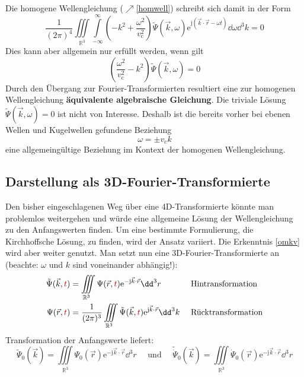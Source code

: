 		 Die homogene Wellengleichung ($\nearrow$\ref{homwell}) schreibt sich damit in der Form
		        \begin{equation}
			        \frac{1}{(2\pi)^4} \iiint\limits_{\mathbb{R}^3} \int\limits_{-\infty}^\infty \left(-k^2+\frac{\omega^2}{ v_\mathrm{c}^2} \right)\tilde{\Psi}(\vec{k}, \omega)  \mathrm{e}^{\mathrm{j}(\vec{k}\cdot\vec{r} -\omega t)} \dd \omega \dd^3k  = 0
		        \end{equation}
		  Dies kann aber allgemein nur erfüllt werden, wenn gilt
		        \begin{equation}
			        \boxed{\left(\frac{\omega^2}{ v_\mathrm{c}^2} -k^2 \right)\tilde{\Psi}(\vec{k}, \omega)  = 0}
		        \end{equation}
		  Durch den Übergang zur Fourier-Transformierten resultiert eine zur homogenen Wellengleichung \textbf{äquivalente algebraische Gleichung}. Die triviale Lösung $\tilde{\Psi}(\vec{k}, \omega)=0$ ist nicht von Interesse. Deshalb ist die bereits vorher bei ebenen Wellen und Kugelwellen gefundene Beziehung
		        \begin{equation}\label{omkv}
			        \boxed{\omega = \pm  v_\mathrm{c} k}
		        \end{equation}
		        eine allgemeingültige Beziehung im Kontext der homogenen Wellengleichung.
  \subsection{Darstellung als 3D-Fourier-Transformierte}
   Den bisher eingeschlagenen Weg über eine 4D-Transformierte könnte man problemlos weitergehen und würde eine allgemeine Lösung der Wellengleichung zu den Anfangswerten finden. Um eine bestimmte Formulierung, die Kirchhoffsche Lösung, zu finden, wird der Ansatz variiert. Die Erkenntnis \ref{omkv} wird aber weiter genutzt. Man setzt nun eine 3D-Fourier-Transformierte an (beachte: $\omega$ und $k$ sind voneinander abhängig!): 
		        \begin{align}
			        \tilde{\Psi}(\vec{k}, \textcolor{red}{t}) & = \iiint\limits_{\mathbb{R}^3} \Psi (\vec{r} , \textcolor{red}{t})  \mathrm{e}^{-\mathrm{j}\vec{k}\cdot\vec{r} } \dd^3 r                         &  & \text{ Hintransformation}  \\
			        \Psi(\vec{r} , \textcolor{red}{t})        & = \frac{1}{(2\pi)^3}\iiint\limits_{\mathbb{R}^3} \tilde{\Psi} (\vec{k}, \textcolor{red}{t})  \mathrm{e}^{\mathrm{j}\vec{k}\cdot\vec{r} } \dd^3 k &  & \text{ Rücktransformation}
		        \end{align}
		  Transformation der Anfangswerte liefert:
		        \begin{equation}
			        \tilde{\Psi}_0(\vec{k}) = \iiint\limits_{\mathbb{R}^3} \Psi_0 (\vec{r} )  \mathrm{e}^{-\mathrm{j}\vec{k}\cdot\vec{r} } \dd^3 r \quad\text{ und }\quad
			        \tilde{\dot{\Psi}}_0(\vec{k}) = \iiint\limits_{\mathbb{R}^3} \dot{\Psi}_0 (\vec{r} )  \mathrm{e}^{-\mathrm{j}\vec{k}\cdot\vec{r} } \dd^3 r
		        \end{equation}
